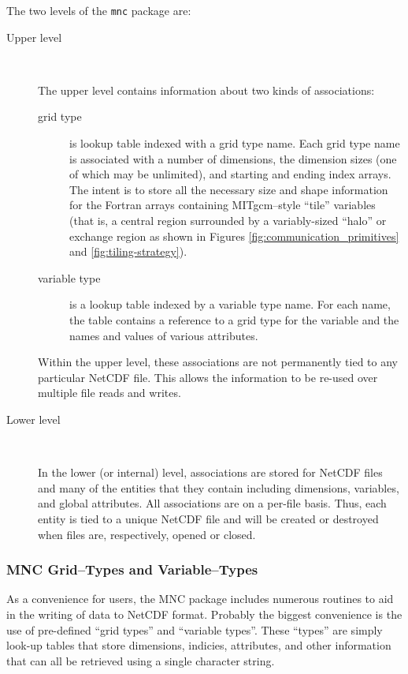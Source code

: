 The two levels of the \texttt{mnc} package are:
\begin{description}

\item[Upper level] \ 
  
  The upper level contains information about two kinds of
  associations:
  \begin{description}
  \item[grid type] is lookup table indexed with a grid type name.
    Each grid type name is associated with a number of dimensions, the
    dimension sizes (one of which may be unlimited), and starting and
    ending index arrays.  The intent is to store all the necessary
    size and shape information for the Fortran arrays containing
    MITgcm--style ``tile'' variables (that is, a central region
    surrounded by a variably-sized ``halo'' or exchange region as
    shown in Figures \ref{fig:communication_primitives} and
    \ref{fig:tiling-strategy}).
  
  \item[variable type] is a lookup table indexed by a variable type
    name.  For each name, the table contains a reference to a grid
    type for the variable and the names and values of various
    attributes.
  \end{description}
  
  Within the upper level, these associations are not permanently tied
  to any particular NetCDF file.  This allows the information to be
  re-used over multiple file reads and writes.

\item[Lower level] \ 
  
  In the lower (or internal) level, associations are stored for NetCDF
  files and many of the entities that they contain including
  dimensions, variables, and global attributes.  All associations are
  on a per-file basis.  Thus, each entity is tied to a unique NetCDF
  file and will be created or destroyed when files are, respectively,
  opened or closed.

\end{description}


\subsubsection{MNC Grid--Types and Variable--Types}

As a convenience for users, the MNC package includes numerous routines
to aid in the writing of data to NetCDF format.  Probably the biggest
convenience is the use of pre-defined ``grid types'' and ``variable
types''.  These ``types'' are simply look-up tables that store
dimensions, indicies, attributes, and other information that can all
be retrieved using a single character string.

